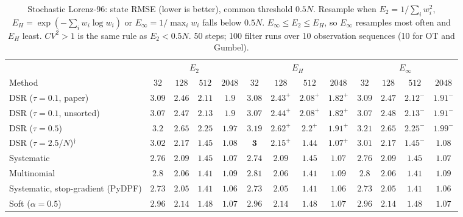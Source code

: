 \begin{table}[ht]
\centering
\small
\caption{Stochastic Lorenz-96: state RMSE (lower is better), common threshold $0.5N$. Resample when $E_2=1/\sum_iw_i^2$, $E_H=\exp(-\sum_iw_i\log w_i)$ or $E_\infty=1/\max_iw_i$ falls below $0.5N$. $E_\infty\le E_2\le E_H$, so $E_\infty$ resamples most often and $E_H$ least. $CV^2>1$ is the same rule as $E_2<0.5N$. 50 steps; 100 filter runs over 10 observation sequences (10 for OT and Gumbel).}
\label{tab:trigger-fixed-lorenz96-rmse}
\begin{adjustbox}{max width=\linewidth}
\begin{tabular}{lcccc|cccc|cccc}
\toprule
 & \multicolumn{4}{c}{$E_2$} & \multicolumn{4}{c}{$E_H$} & \multicolumn{4}{c}{$E_\infty$} \\
\cmidrule(lr){2-5} \cmidrule(lr){6-9} \cmidrule(lr){10-13}
Method & $32$ & $128$ & $512$ & $2048$ & $32$ & $128$ & $512$ & $2048$ & $32$ & $128$ & $512$ & $2048$ \\
\midrule
DSR ($\tau{=}0.1$, paper) & $3.09$ & $2.46$ & $2.11$ & $1.9$ & $\mathbf{3.08}$ & $\mathbf{2.43}^{+}$ & $\mathbf{2.08}^{+}$ & $\mathbf{1.82}^{+}$ & $3.09$ & $2.47$ & $2.12^{-}$ & $1.91^{-}$ \\
DSR ($\tau{=}0.1$, unsorted) & $3.07$ & $2.47$ & $2.13$ & $1.9$ & $3.07$ & $\mathbf{2.44}^{+}$ & $\mathbf{2.08}^{+}$ & $\mathbf{1.82}^{+}$ & $\mathbf{3.07}$ & $2.48$ & $2.13^{-}$ & $1.91^{-}$ \\
DSR ($\tau{=}0.5$) & $3.2$ & $2.65$ & $2.25$ & $1.97$ & $\mathbf{3.19}$ & $\mathbf{2.62}^{+}$ & $\mathbf{2.2}^{+}$ & $\mathbf{1.91}^{+}$ & $3.21$ & $2.65$ & $2.25^{-}$ & $1.99^{-}$ \\
DSR ($\tau{=}2.5/N$)$^\dagger$ & $3.02$ & $2.17$ & $1.45$ & $1.08$ & $\mathbf{3}$ & $\mathbf{2.15}^{+}$ & $\mathbf{1.44}$ & $\mathbf{1.07}^{+}$ & $3.01$ & $2.17$ & $1.45^{-}$ & $1.08$ \\
\midrule
Systematic & $2.76$ & $2.09$ & $1.45$ & $\mathbf{1.07}$ & $\mathbf{2.74}$ & $\mathbf{2.09}$ & $\mathbf{1.45}$ & $1.07$ & $2.76$ & $2.09$ & $1.45$ & $1.07$ \\
Multinomial & $\mathbf{2.8}$ & $2.06$ & $\mathbf{1.41}$ & $1.09$ & $2.81$ & $\mathbf{2.06}$ & $1.41$ & $1.09$ & $2.8$ & $2.06$ & $1.41$ & $\mathbf{1.09}$ \\
Systematic, stop-gradient (PyDPF) & $2.73$ & $\mathbf{2.05}$ & $1.41$ & $\mathbf{1.06}$ & $2.73$ & $2.05$ & $1.41$ & $1.06$ & $\mathbf{2.73}$ & $2.05$ & $\mathbf{1.41}$ & $1.06$ \\
Soft ($\alpha{=}0.5$) & $\mathbf{2.96}$ & $2.14$ & $\mathbf{1.48}$ & $\mathbf{1.07}$ & $2.96$ & $\mathbf{2.14}$ & $1.48$ & $\mathbf{1.07}$ & $\mathbf{2.96}$ & $2.14$ & $\mathbf{1.48}$ & $\mathbf{1.07}$ \\

\end{tabular}
\end{adjustbox}
\end{table}
